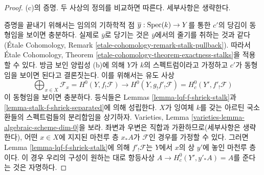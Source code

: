 \begin{proof}
\medskip\noindent
(c)의 증명. 두 사상의 정의를 비교하면 따른다. 세부사항은 생략한다.

\medskip\noindent
증명을 끝내기 위해서는 임의의 기하학적 점
$\overline{y} : \mathop{\mathrm{Spec}}(k) \to Y$를 통한 $c'$의 당김이 동형임을 보이면
충분하다. 실제로 $\overline{y}$로 당기는 것은 $\overline{y}$에서의
줄기를 취하는 것과 같다(\'Etale Cohomology, Remark
\ref{etale-cohomology-remark-stalk-pullback}). 따라서
\'Etale Cohomology, Theorem
\ref{etale-cohomology-theorem-exactness-stalks}을 적용할 수 있다.
방금 보인 양립성 (b)에 의해 $Y$가 $k$의 스펙트럼이라고 가정하고
$c'$가 동형임을 보이면 된다고 결론짓는다. 이를 위해서는 유도 사상
$$
\bigoplus\nolimits_{x \in X} \mathcal{F}_x = H^0(Y, f_!\mathcal{F})
\longrightarrow
H^0(Y, g_!f'_!\mathcal{F}) = H^0_c(Y', f'_!\mathcal{F})
$$
이 동형임을 보이면 충분하다. 등식들은 Lemmas
\ref{lemma-lqf-f-shriek-stalk}과
\ref{lemma-stalk-f-shriek-separated}에 의해 성립한다.
$X$가 잉여체 $k$를 갖는 아르틴 국소환들의 스펙트럼들의 분리합임을
상기하자. Varieties, Lemma
\ref{varieties-lemma-algebraic-scheme-dim-0}을 보라. 좌변과 우변은
직합과 가환하므로(세부사항은 생략한다), 어떤 $x \in X$에 지지된
마천루 층 $x_*A$가 $\mathcal{F}$인 경우를 가정할 수 있다.
그러면 Lemma \ref{lemma-lqf-f-shriek-stalk}에 의해
$f'_!\mathcal{F}$는 $Y$에서 $x$의 상 $y'$에 놓인 마천루 층이다.
이 경우 우리의 구성이 원하는 대로 항등사상
$A \to H^0_c(Y', y'_*A) = A$를 준다는 것은 자명하다.
\end{proof}

